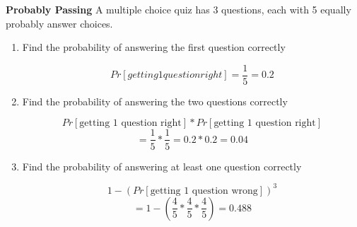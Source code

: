 \question \textbf{Probably Passing} A multiple choice quiz has 3 questions, each with 5 equally probably answer choices.
\begin{enumerate}[label=(\alph*)]
\item Find the probability of answering the first question correctly
\begin{solution}
\[Pr[getting 1 question right] = \frac{1}{5} = 0.2\]
\end{solution}

\item Find the probability of answering the two questions correctly
\begin{solution}
\[Pr[\text{getting 1 question right}] * Pr[\text{getting 1 question right}]\]
\[= \frac{1}{5} * \frac{1}{5} = 0.2*0.2 = 0.04\]
\end{solution}

\item  Find the probability of answering at least one question correctly
\begin{solution}
\[1 - (Pr[\text{getting 1 question wrong}])^3\]
\[= 1 - (\frac{4}{5}  * \frac{4}{5}  * \frac{4}{5} ) = 0.488\]
\end{solution}
\end{enumerate}